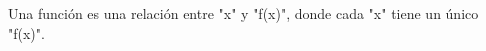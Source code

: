 \documentclass[preview]{standalone}
\begin{document}
\begin{center}
Una función es una relación entre "x" y "f(x)", donde cada "x" tiene un único "f(x)".
\end{center}
\end{document}
